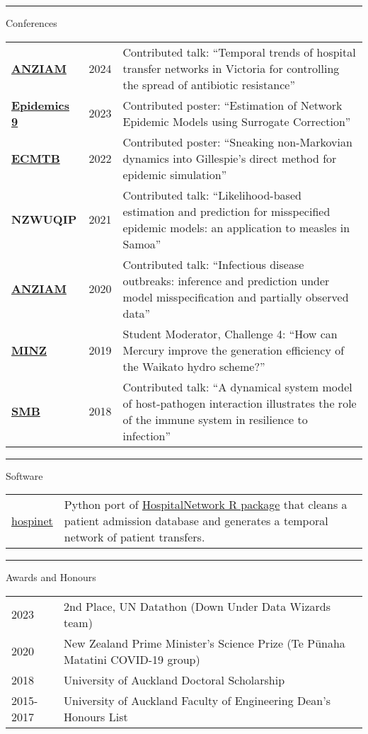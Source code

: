 \documentclass[paper=a4paper,fontsize=11pt]{scrartcl}
\newcommand{\pagerule}[1][2pt]{\noindent\rule{\textwidth}{#1}}
\newcommand{\usingfont}[2]{#1 #2 \par \normalsize \normalfont}
\newcommand{\sectionheader}[1]{\pagerule \vspace{0.05ex} \usingfont{\usefont{T1}{phv}{m}{v} \Large}{\noindent \hspace{-0.5em} #1} \vspace{0.5ex}}
\newlength{\spacebox}
\begin{document}
\sectionheader{Conferences}
\vspace{0.5ex}
\noindent 
\begin{tabular}{p{1.1\spacebox} p{0.5\spacebox} p{6.7\spacebox}}
\href{https://www.mathematics.org.au/sys/pages/plain.php?page\_id=39\&conf\_id=61}{\textbf{ANZIAM}} & 2024 & Contributed
talk: ``Temporal trends of hospital transfer networks in Victoria for
controlling the spread of antibiotic resistance'' \\
\href{https://www.elsevier.com/events/conferences/all/international-conference-on-infectious-disease-dynamics}{\textbf{Epidemics
9}} & 2023 & Contributed poster: ``Estimation of Network Epidemic Models
using Surrogate Correction'' \\
\href{https://ecmtb2022.org}{\textbf{ECMTB}} & 2022 & Contributed
poster: ``Sneaking non-Markovian dynamics into Gillespie's direct method
for epidemic simulation'' \\
\textbf{NZWUQIP} & 2021 & Contributed talk: ``Likelihood-based
estimation and prediction for misspecified epidemic models: an
application to measles in Samoa'' \\
\href{http://www.maths.mq.edu.au/ANZIAM2020}{\textbf{ANZIAM}} & 2020 & Contributed
talk: ``Infectious disease outbreaks: inference and prediction under
model misspecification and partially observed data'' \\
\href{https:/minz.org.nz/2019/}{\textbf{MINZ}} & 2019 & Student
Moderator, Challenge 4: ``How can Mercury improve the generation
efficiency of the Waikato hydro scheme?'' \\
\href{http://conferences.science.unsw.edu.au/SMB2018/}{\textbf{SMB}} & 2018 & Contributed
talk: ``A dynamical system model of host-pathogen interaction
illustrates the role of the immune system in resilience to
infection'' \\
\end{tabular}

\sectionheader{Software}
\vspace{0.5ex}\noindent
\begin{tabular}{p{1.6\spacebox} p{6.7\spacebox}}
\href{https://pypi.org/project/hospinet/}{hospinet} & Python port of
\href{https://cran.r-project.org/web//packages//HospitalNetwork/index.html}{HospitalNetwork
R package} that cleans a patient admission database and generates a
temporal network of patient transfers. \\
\end{tabular}

\sectionheader{Awards and Honours}
\vspace{0.5ex}\noindent
\begin{tabular}{p{1.0\spacebox} p{0.2\spacebox} p{6.5\spacebox}}
2023 & \multicolumn{2}{l}{2nd Place, UN Datathon (Down Under Data
Wizards team)} \\
2020 & \multicolumn{2}{l}{New Zealand Prime Minister's Science Prize (Te
Pūnaha Matatini COVID-19 group)} \\
2018 & \multicolumn{2}{l}{University of Auckland Doctoral
Scholarship} \\
2015-2017 & \multicolumn{2}{l}{University of Auckland Faculty of
Engineering Dean's Honours List} \\
\end{tabular}
\end{document}
